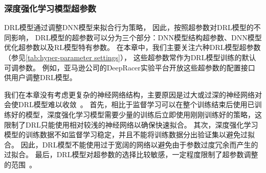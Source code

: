 \subsubsection{深度强化学习模型超参数}
\begin{table}[!t]
    \caption{超参数总结}
    \label{tab:hyper-parameter settings}
    \centering
\end{table}
DRL模型通过调整DNN模型来拟合行为策略，
因此，按照超参数对DRL模型的不同影响，
DRL模型的超参数可以分为三个部分：DNN模型结构超参数、DNN模型优化超参数以及RL模型特有参数。
在本章中，我们主要关注六种DRL模型超参数（参见\autoref{tab:hyper-parameter settings}），
这些超参数常作为DRL模型训练的默认可调参数。
例如，亚马逊公司的DeepRacer实验平台\cite{BMGGDKRSTTCMK19}开放这些超参数的配置接口供用户调整DRL模型。

我们在本章没有考虑更复杂的神经网络结构，主要原因是过大或过深的神经网络对会使DRL模型难以收敛~\cite{ota2020can}。
首先，相比于监督学习可以在整个训练结束后使用已训练好的模型，深度强化学习模型需要少量的训练后立即使用刚刚训练好的策略，这限制了DRL只能使用相对较浅的神经网络以确保快速拟合。
其次，深度强化学习模型的训练数据不如监督学习稳定，并且不能将训练数据分出验证集以避免过拟合。
因此，DRL模型不能使用过于宽阔的网络以避免由于参数过度冗余而产生的过拟合。
最后，DRL模型对超参数的选择比较敏感，一定程度限制了超参数调整的范围~\cite{henderson2018deep}。

